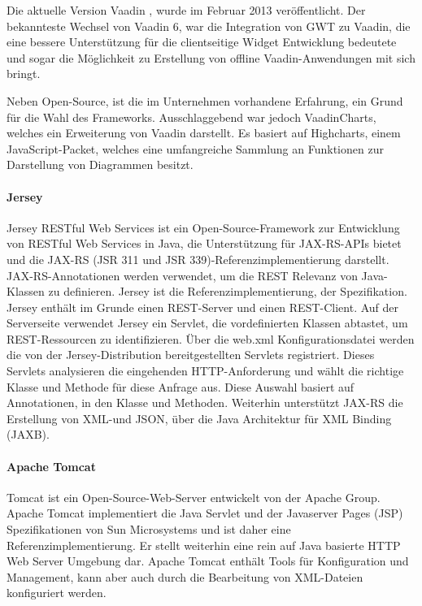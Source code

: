 Die aktuelle Version Vaadin , wurde im Februar 2013 veröffentlicht. Der bekannteste Wechsel von Vaadin 6, war die Integration von GWT zu Vaadin, die eine bessere Unterstützung für die clientseitige Widget Entwicklung bedeutete und sogar die Möglichkeit zu Erstellung von offline Vaadin-Anwendungen mit sich bringt.

Neben Open-Source, ist die im Unternehmen vorhandene Erfahrung, ein Grund für die Wahl des Frameworks. Ausschlaggebend war jedoch VaadinCharts, welches ein Erweiterung von Vaadin darstellt. Es basiert auf Highcharts, einem JavaScript-Packet, welches eine umfangreiche Sammlung an Funktionen zur Darstellung von Diagrammen besitzt. 

\paragraph{Jersey}

Jersey RESTful Web Services ist ein Open-Source-Framework zur Entwicklung von RESTful Web Services in Java, die Unterstützung für JAX-RS-APIs bietet und die JAX-RS (JSR 311 und JSR 339)-Referenzimplementierung darstellt. JAX-RS-Annotationen werden verwendet, um die REST Relevanz von Java-Klassen zu definieren. Jersey ist die Referenzimplementierung, der Spezifikation. Jersey enthält im Grunde einen REST-Server und einen REST-Client. Auf der Serverseite verwendet Jersey ein Servlet, die vordefinierten Klassen abtastet, um REST-Ressourcen zu identifizieren. Über die web.xml Konfigurationsdatei werden die von der Jersey-Distribution bereitgestellten Servlets registriert. Dieses Servlets analysieren die eingehenden HTTP-Anforderung und wählt die richtige Klasse und Methode für diese Anfrage aus. Diese Auswahl basiert auf Annotationen, in den Klasse und Methoden. Weiterhin unterstützt JAX-RS die Erstellung von XML-und JSON, über die Java Architektur für XML Binding (JAXB).

\paragraph{Apache Tomcat}

Tomcat ist ein Open-Source-Web-Server entwickelt von der Apache Group. Apache Tomcat implementiert die Java Servlet und der Javaserver Pages (JSP) Spezifikationen von Sun Microsystems und ist daher eine Referenzimplementierung. Er stellt weiterhin eine rein auf Java basierte HTTP Web Server Umgebung dar. Apache Tomcat enthält Tools für Konfiguration und Management, kann aber auch durch die Bearbeitung von XML-Dateien konfiguriert werden.

